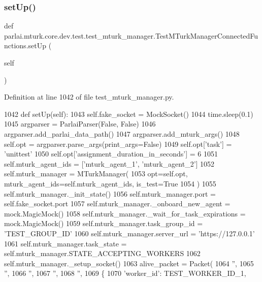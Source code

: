 \subsubsection{\texorpdfstring{set\+Up()}{setUp()}}
{\footnotesize\ttfamily def parlai.\+mturk.\+core.\+dev.\+test.\+test\+\_\+mturk\+\_\+manager.\+Test\+M\+Turk\+Manager\+Connected\+Functions.\+set\+Up (\begin{DoxyParamCaption}\item[{}]{self }\end{DoxyParamCaption})}



Definition at line 1042 of file test\+\_\+mturk\+\_\+manager.\+py.


\begin{DoxyCode}
1042     \textcolor{keyword}{def }setUp(self):
1043         self.fake\_socket = MockSocket()
1044         time.sleep(0.1)
1045         argparser = ParlaiParser(\textcolor{keyword}{False}, \textcolor{keyword}{False})
1046         argparser.add\_parlai\_data\_path()
1047         argparser.add\_mturk\_args()
1048         self.opt = argparser.parse\_args(print\_args=\textcolor{keyword}{False})
1049         self.opt[\textcolor{stringliteral}{'task'}] = \textcolor{stringliteral}{'unittest'}
1050         self.opt[\textcolor{stringliteral}{'assignment\_duration\_in\_seconds'}] = 6
1051         self.mturk\_agent\_ids = [\textcolor{stringliteral}{'mturk\_agent\_1'}, \textcolor{stringliteral}{'mturk\_agent\_2'}]
1052         self.mturk\_manager = MTurkManager(
1053             opt=self.opt, mturk\_agent\_ids=self.mturk\_agent\_ids, is\_test=\textcolor{keyword}{True}
1054         )
1055         self.mturk\_manager.\_init\_state()
1056         self.mturk\_manager.port = self.fake\_socket.port
1057         self.mturk\_manager.\_onboard\_new\_agent = mock.MagicMock()
1058         self.mturk\_manager.\_wait\_for\_task\_expirations = mock.MagicMock()
1059         self.mturk\_manager.task\_group\_id = \textcolor{stringliteral}{'TEST\_GROUP\_ID'}
1060         self.mturk\_manager.server\_url = \textcolor{stringliteral}{'https://127.0.0.1'}
1061         self.mturk\_manager.task\_state = self.mturk\_manager.STATE\_ACCEPTING\_WORKERS
1062         self.mturk\_manager.\_setup\_socket()
1063         alive\_packet = Packet(
1064             \textcolor{stringliteral}{''},
1065             \textcolor{stringliteral}{''},
1066             \textcolor{stringliteral}{''},
1067             \textcolor{stringliteral}{''},
1068             \textcolor{stringliteral}{''},
1069             \{
1070                 \textcolor{stringliteral}{'worker\_id'}: TEST\_WORKER\_ID\_1,

\end{DoxyCode}
